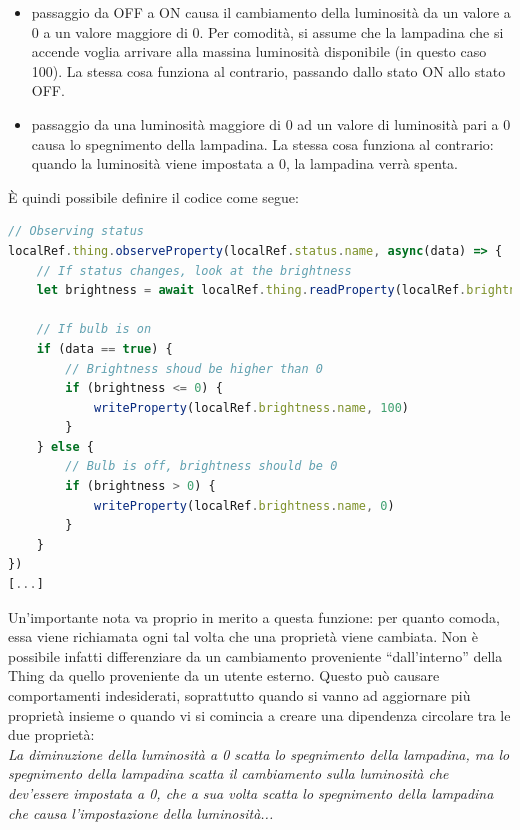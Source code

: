 \documentclass[12pt,a4paper,openright,oneside]{report}
\newcommand{\quotes}[1]{``#1''}
\begin{document}
\begin{itemize}
	\item passaggio da OFF a ON causa il cambiamento della luminosità da un valore a 0 a un valore maggiore di 0. Per comodità, si assume che la lampadina che si accende voglia arrivare alla massina luminosità disponibile (in questo caso 100). La stessa cosa funziona al contrario, passando dallo stato ON allo stato OFF.
	
	\item passaggio da una luminosità maggiore di 0 ad un valore di luminosità pari a 0 causa lo spegnimento della lampadina. La stessa cosa funziona al contrario: quando la luminosità viene impostata a 0, la lampadina verrà spenta.
\end{itemize}

È quindi possibile definire il codice come segue:

\begin{lstlisting}[language=JavaScript,caption={Reagire al cambiamento delle proprietà in \texttt{bulb.js}}]
// Observing status
localRef.thing.observeProperty(localRef.status.name, async(data) => {
	// If status changes, look at the brightness
	let brightness = await localRef.thing.readProperty(localRef.brightness.name)
	
	// If bulb is on
	if (data == true) {
		// Brightness shoud be higher than 0
		if (brightness <= 0) {
			writeProperty(localRef.brightness.name, 100)
		}
	} else {
		// Bulb is off, brightness should be 0
		if (brightness > 0) {
			writeProperty(localRef.brightness.name, 0)
		}
	}
})
[...]
\end{lstlisting}

Un'importante nota va proprio in merito a questa funzione: per quanto comoda, essa viene richiamata ogni tal volta che una proprietà viene cambiata. Non è possibile infatti differenziare da un cambiamento proveniente \quotes{dall'interno} della Thing da quello proveniente da un utente esterno. Questo può causare comportamenti indesiderati, soprattutto quando si vanno ad aggiornare più proprietà insieme o quando vi si comincia a creare una dipendenza circolare tra le due proprietà:\\

	\textit{La diminuzione della luminosità a 0 scatta lo spegnimento della lampadina, ma lo spegnimento della lampadina scatta il cambiamento sulla luminosità che dev'essere impostata a 0, che a sua volta scatta lo spegnimento della lampadina che causa l'impostazione della luminosità...}\\
	
\end{document}
